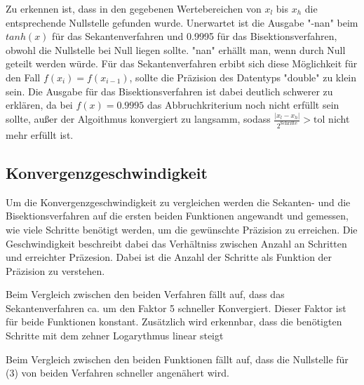 \documentclass[10pt]{article}
\newenvironment{Figure}
  {\par\medskip\noindent\minipage{\linewidth}}
  {\endminipage\par\medskip}
\begin{document}
\begin{multicols}{2}

  Zu erkennen ist, dass in den gegebenen Wertebereichen von \(x_l\) bis \(x_h\) die entsprechende Nullstelle gefunden wurde.
  Unerwartet ist die Ausgabe "-nan" beim \(tanh(x)\) für das Sekantenverfahren und 0.9995 für das Bisektionsverfahren, obwohl die Nullstelle bei Null liegen sollte. "nan" erhällt man, wenn durch Null geteilt werden würde. Für das Sekantenverfahren erbibt sich diese Möglichkeit für den Fall \(f(x_i)=f(x_{i-1})\), sollte die Präzision des Datentyps "double" zu klein sein. Die Ausgabe für das Bisektionsverfahren ist dabei deutlich schwerer zu erklären, da bei \(f(x)=0.9995\) das Abbruchkriterium noch nicht erfüllt sein sollte, außer der Algoithmus konvergiert zu langsamm, sodass \(\frac{|x_l-x_h|}{2^{\text{Schritte}}}>\text{tol}\) nicht mehr erfüllt ist.
  

\subsection{Konvergenzgeschwindigkeit}
Um die Konvergenzgeschwindigkeit zu vergleichen werden die Sekanten- und die Bisektionsverfahren auf die ersten beiden Funktionen angewandt und gemessen, wie viele Schritte benötigt werden, um die gewünschte Präzision zu erreichen. Die Geschwindigkeit beschreibt dabei das Verhältniss zwischen Anzahl an Schritten und erreichter Präzesion. Dabei ist die Anzahl der Schritte als Funktion der Präzision zu verstehen.

\begin{Figure}
  \centering
\end{Figure}
\begin{Figure}
  \centering
\end{Figure}

Beim Vergleich zwischen den beiden Verfahren fällt auf, dass das Sekantenverfahren ca. um den Faktor 5 schneller Konvergiert. Dieser Faktor ist für beide Funktionen konstant. Zusätzlich wird erkennbar, dass die benötigten Schritte mit dem zehner Logarythmus linear steigt

Beim Vergleich zwischen den beiden Funktionen fällt auf, dass die Nullstelle für (3) von beiden Verfahren schneller angenähert wird.



\end{multicols}
\end{document}
